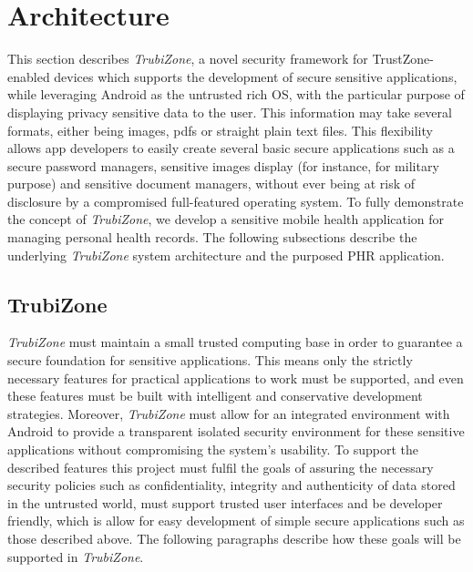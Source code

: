 
% 
% 
\section{Architecture}
\label{sec:architecture}

This section describes \emph{TrubiZone}, a novel security framework for TrustZone-enabled devices which supports the development of secure sensitive applications, while leveraging Android as the untrusted rich OS, with the particular purpose of displaying privacy sensitive data to the user. This information may take several formats, either being images, pdfs or straight plain text files. This flexibility allows app developers to easily create several basic secure applications such as a secure password managers, sensitive images display (for instance, for military purpose) and sensitive document managers, without ever being at risk of disclosure by a compromised full-featured operating system. To fully demonstrate the concept of \emph{TrubiZone}, we develop a sensitive mobile health application for managing personal health records. The following subsections describe the underlying \emph{TrubiZone} system architecture and the purposed \ac{PHR} application.

\subsection{TrubiZone}

\emph{TrubiZone} must maintain a small trusted computing base in order to guarantee a secure foundation for sensitive applications. This means only the strictly necessary features for practical applications to work must be supported, and even these features must be built with intelligent and conservative development strategies. Moreover, \emph{TrubiZone} must allow for an integrated environment with Android to provide a transparent isolated security environment for these sensitive applications without compromising the system's usability. To support the described features this project must fulfil the goals of assuring the necessary security policies such as confidentiality, integrity and authenticity of data stored in the untrusted world, must support trusted user interfaces and be developer friendly, which is allow for easy development of simple secure applications such as those described above. The following paragraphs describe how these goals will be supported in \emph{TrubiZone}.

